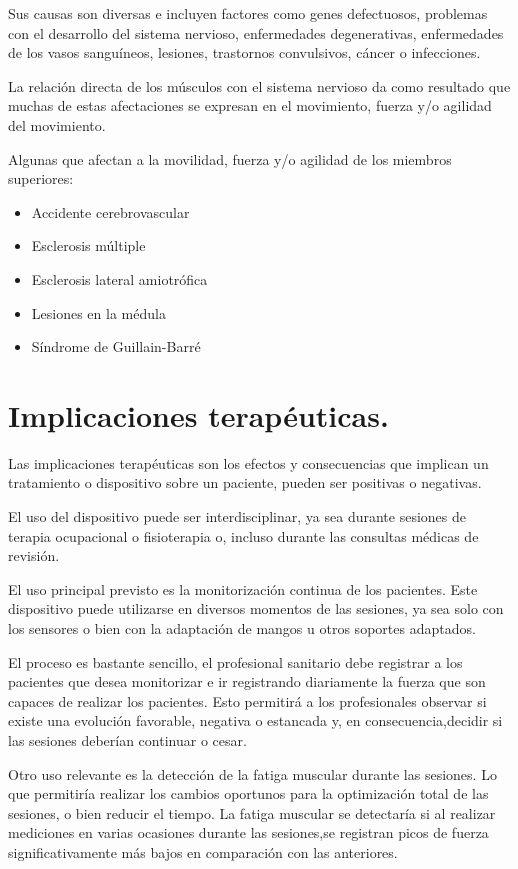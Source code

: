 Sus causas son diversas e incluyen factores como genes defectuosos, problemas con el desarrollo del sistema nervioso, enfermedades degenerativas, enfermedades de los vasos sanguíneos, lesiones, trastornos convulsivos, cáncer o infecciones. \cite{enfermedades_neurológicas}

La relación directa de los músculos con el sistema nervioso da como resultado que muchas de estas afectaciones se expresan en el movimiento, fuerza y/o agilidad del movimiento. 

Algunas que afectan a la movilidad, fuerza y/o agilidad de los miembros superiores: 
\begin{itemize}
    \item Accidente cerebrovascular
    \item Esclerosis múltiple
    \item Esclerosis lateral amiotrófica
    \item Lesiones en la médula
    \item Síndrome de Guillain-Barré
\end{itemize}

\section{Implicaciones terapéuticas.}
Las implicaciones terapéuticas son los efectos y consecuencias que implican un tratamiento o dispositivo sobre un paciente, pueden ser positivas o negativas.

El uso del dispositivo puede ser interdisciplinar, ya sea durante sesiones de terapia ocupacional o fisioterapia o, incluso durante las consultas médicas de revisión. 

El uso principal previsto es la monitorización continua de los pacientes. Este dispositivo puede utilizarse en diversos momentos de las sesiones, ya sea solo con los sensores o bien con la adaptación de mangos u otros soportes adaptados.

El proceso es bastante sencillo, el profesional sanitario debe registrar a los pacientes que desea monitorizar e ir registrando diariamente la fuerza que son capaces de realizar los pacientes. Esto permitirá a los profesionales observar si existe una evolución favorable, negativa o estancada y, en consecuencia,decidir si las sesiones deberían continuar o cesar. 

Otro uso relevante es la detección de la fatiga muscular durante las sesiones. Lo que permitiría realizar los cambios oportunos para la optimización total de las sesiones, o bien reducir el tiempo. La fatiga muscular se detectaría si al realizar mediciones en varias ocasiones durante las sesiones,se registran picos de fuerza significativamente más bajos en comparación con las anteriores.

